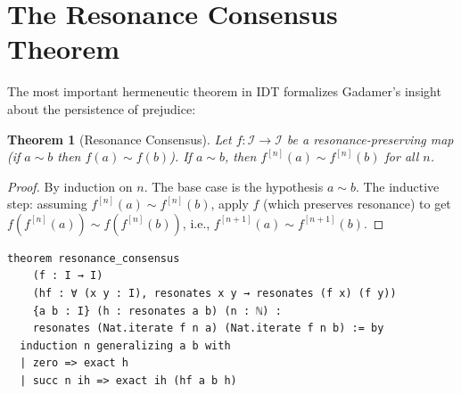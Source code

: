 \documentclass[11pt,openany]{book}
\theoremstyle{definition}
\theoremstyle{plain}
\newtheorem{theorem}[axiom]{Theorem}
\theoremstyle{remark}
\newcommand{\IS}{\mathcal{I}}               %
\newcommand{\res}{\sim}                      %
\begin{document}
\section{The Resonance Consensus Theorem}

The most important hermeneutic theorem in IDT formalizes Gadamer's insight about the persistence of prejudice:

\begin{theorem}[Resonance Consensus]
\label{thm:resonance-consensus}
Let $f : \IS \to \IS$ be a resonance-preserving map (if $a \res b$ then $f(a) \res f(b)$). If $a \res b$, then $f^{[n]}(a) \res f^{[n]}(b)$ for all $n$.
\end{theorem}

\begin{proof}
By induction on $n$. The base case is the hypothesis $a \res b$. The inductive step: assuming $f^{[n]}(a) \res f^{[n]}(b)$, apply $f$ (which preserves resonance) to get $f(f^{[n]}(a)) \res f(f^{[n]}(b))$, i.e., $f^{[n+1]}(a) \res f^{[n+1]}(b)$.
\end{proof}

\begin{lstlisting}
theorem resonance_consensus
    (f : I → I)
    (hf : ∀ (x y : I), resonates x y → resonates (f x) (f y))
    {a b : I} (h : resonates a b) (n : ℕ) :
    resonates (Nat.iterate f n a) (Nat.iterate f n b) := by
  induction n generalizing a b with
  | zero => exact h
  | succ n ih => exact ih (hf a b h)
\end{lstlisting}
\end{document}

